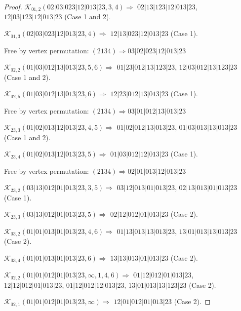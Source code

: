 \documentclass[12pt]{article}
\theoremstyle{plain}
\theoremstyle{definition}
\theoremstyle{remark}
\newcommand{\fancy}[1]{\mathcal{#1}}
\def\K{\fancy{K}}
\begin{document}
\begin{proof}
	
	
	\bigskip
	
	$\K_{01,2}(02|03|023|12|013|23,3, 4)\Rightarrow $ $02|13|123|12|013|23$, $12|03|123|12|013|23$ (Case 1 and 2).
	
	$\K_{01,3}(02|03|023|12|013|23,4)\Rightarrow $ $12|13|023|12|013|23$ (Case 1).
	
	
	
	Free by vertex permutation: $(2 1 3 4)\Rightarrow 03|02|023|12|013|23$
	
	
	
	\bigskip
	
	$\K_{02,2}(01|03|012|13|013|23,5, 6)\Rightarrow $ $01|23|012|13|123|23$, $12|03|012|13|123|23$ (Case 1 and 2).
	
	$\K_{02,5}(01|03|012|13|013|23,6)\Rightarrow $ $12|23|012|13|013|23$ (Case 1).
	
	
	
	Free by vertex permutation: $(2 1 3 4)\Rightarrow 03|01|012|13|013|23$
	
	
	
	\bigskip
	
	$\K_{23,3}(01|02|013|12|013|23,4, 5)\Rightarrow $ $01|02|012|13|013|23$, $01|03|013|13|013|23$ (Case 1 and 2).
	
	$\K_{23,4}(01|02|013|12|013|23,5)\Rightarrow $ $01|03|012|12|013|23$ (Case 1).
	
	
	
	Free by vertex permutation: $(2 1 3 4)\Rightarrow 02|01|013|12|013|23$
	
	
	
	\bigskip
	
	$\K_{23,2}(03|13|012|01|013|23,3, 5)\Rightarrow $ $03|12|013|01|013|23$, $02|13|013|01|013|23$ (Case 1).
	
	$\K_{23,3}(03|13|012|01|013|23,5)\Rightarrow $ $02|12|012|01|013|23$ (Case 2).
	
	
	\bigskip
	
	$\K_{03,2}(01|01|013|01|013|23,4, 6)\Rightarrow $ $01|13|013|13|013|23$, $13|01|013|13|013|23$ (Case 2).
	
	$\K_{03,4}(01|01|013|01|013|23,6)\Rightarrow $ $13|13|013|01|013|23$ (Case 2).
	
	
	\bigskip
	
	$\K_{02,2}(01|01|012|01|013|23,\infty,1, 4, 6)\Rightarrow $ $01|12|012|01|013|23$, $12|12|012|01|013|23$, $01|12|012|12|013|23$, $13|01|013|13|123|23$ (Case 2).
	
	$\K_{02,1}(01|01|012|01|013|23,\infty)\Rightarrow $ $12|01|012|01|013|23$ (Case 2).
	

\end{proof}
\end{document}
